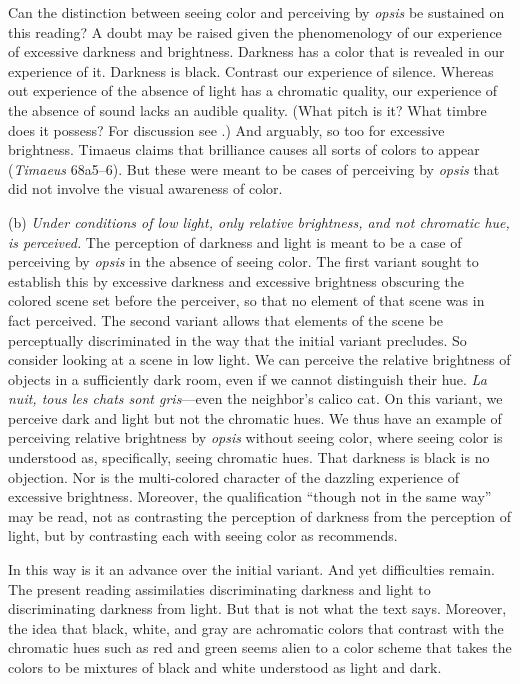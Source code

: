Can the distinction between seeing color and perceiving by \emph{opsis} be sustained on this reading? A doubt may be raised given the phenomenology of our experience of excessive darkness and brightness. Darkness has a color that is revealed in our experience of it. Darkness is black. Contrast our experience of silence. Whereas out experience of the absence of light has a chromatic quality, our experience of the absence of sound lacks an audible quality. (What pitch is it? What timbre does it possess? For discussion see \citealt{Sorensen:2008kx,Sorensen:2009aa}.) And arguably, so too for excessive brightness. Timaeus claims that brilliance causes all sorts of colors to appear (\emph{Timaeus} 68a5–6). But these were meant to be cases of perceiving by \emph{opsis} that did not involve the visual awareness of color.

(b) \emph{Under conditions of low light, only relative brightness, and not chromatic hue, is perceived.} The perception of darkness and light is meant to be a case of perceiving by \emph{opsis} in the absence of seeing color. The first variant sought to establish this by excessive darkness and excessive brightness obscuring the colored scene set before the perceiver, so that no element of that scene was in fact perceived. The second variant allows that elements of the scene be perceptually discriminated in the way that the initial variant precludes. So consider looking at a scene in low light. We can perceive the relative brightness of objects in a sufficiently dark room, even if we cannot distinguish their hue. \emph{La nuit, tous les chats sont gris}—even the neighbor's calico cat. On this variant, we perceive dark and light but not the chromatic hues. We thus have an example of perceiving relative brightness by \emph{opsis} without seeing color, where seeing color is understood as, specifically, seeing chromatic hues. That darkness is black is no objection. Nor is the multi-colored character of the dazzling experience of excessive brightness. Moreover, the qualification ``though not in the same way'' may be read, not as contrasting the perception of darkness from the perception of light, but by contrasting each with seeing color as \citet[275]{Ross:1961uq} recommends.

In this way is it an advance over the initial variant. And yet difficulties remain. The present reading assimilaties discriminating darkness and light to discriminating darkness from light. But that is not what the text says. Moreover, the idea that black, white, and gray are achromatic colors that contrast with the chromatic hues such as red and green seems alien to a color scheme that takes the colors to be mixtures of black and white understood as light and dark.

